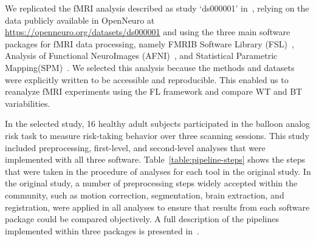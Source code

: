\documentclass[conference]{IEEEtran}
\begin{document}
We replicated the fMRI analysis described as study `ds000001' in~\cite{bowring2019exploring}, relying on
the data publicly available in OpenNeuro at \url{https://openneuro.org/datasets/ds000001}
and using the three main software packages for fMRI data processing, namely
FMRIB Software Library (FSL)~\cite{jenkinson2012fsl}, Analysis of Functional NeuroImages (AFNI)~\cite{cox1996afni},
and Statistical Parametric Mapping(SPM)~\cite{penny2011statistical}.
We selected this analysis because the methods and datasets were explicitly
written to be accessible and reproducible. This enabled us to reanalyze fMRI experiments using the FL framework and
compare WT and BT variabilities.

In the selected study, 16 healthy adult subjects participated in the balloon analog risk task to measure
risk-taking behavior over three scanning sessions.
This study included preprocessing, first-level, and second-level analyses that were implemented with all three software.
Table~\ref{table:pipeline-steps} shows the steps that were taken in the procedure of analyses for each tool in the original study.
In the original study, a number of preprocessing steps widely accepted within the community, such as motion correction,
segmentation, brain extraction, and registration, were applied in all analyses to ensure that results from each software
package could be compared objectively.
A full description of the pipelines implemented within three packages is presented in~\cite{bowring2019exploring,schonberg2012decreasing}.
\end{document}
